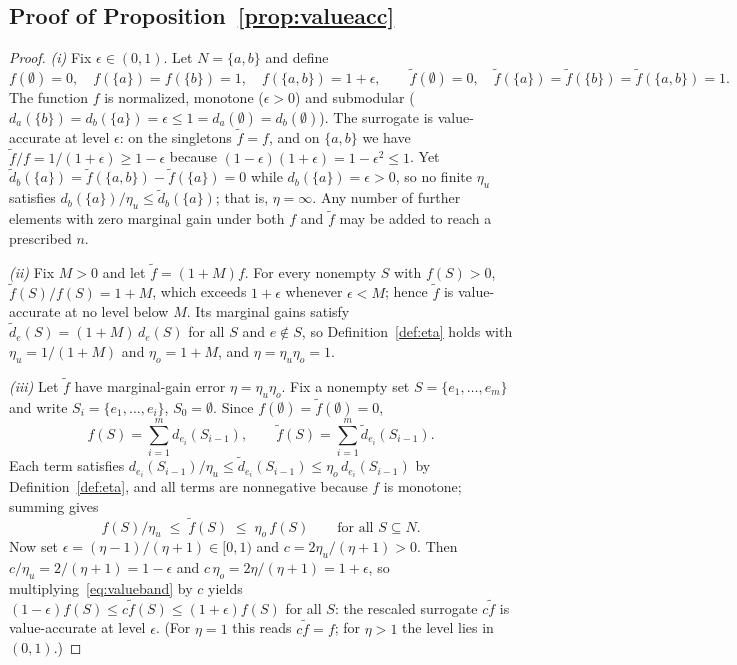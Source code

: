 \subsection{Proof of Proposition~\ref{prop:valueacc}}

\begin{proof}
\emph{(i)} Fix $\epsilon\in(0,1)$. Let $N=\{a,b\}$ and define
\[
f(\emptyset)=0,\quad f(\{a\})=f(\{b\})=1,\quad f(\{a,b\})=1+\epsilon,
\qquad
\tilde f(\emptyset)=0,\quad \tilde f(\{a\})=\tilde f(\{b\})=\tilde f(\{a,b\})=1 .
\]
The function $f$ is normalized, monotone ($\epsilon>0$) and submodular ($d_a(\{b\})=d_b(\{a\})=\epsilon\le 1=d_a(\emptyset)=d_b(\emptyset)$). The surrogate is value-accurate at level $\epsilon$: on the singletons $\tilde f=f$, and on $\{a,b\}$ we have $\tilde f/f=1/(1+\epsilon)\ge 1-\epsilon$ because $(1-\epsilon)(1+\epsilon)=1-\epsilon^2\le1$. Yet $\tilde d_b(\{a\})=\tilde f(\{a,b\})-\tilde f(\{a\})=0$ while $d_b(\{a\})=\epsilon>0$, so no finite $\eta_u$ satisfies $d_b(\{a\})/\eta_u\le\tilde d_b(\{a\})$; that is, $\eta=\infty$. Any number of further elements with zero marginal gain under both $f$ and $\tilde f$ may be added to reach a prescribed $n$.

\emph{(ii)} Fix $M>0$ and let $\tilde f=(1+M)f$. For every nonempty $S$ with $f(S)>0$, $\tilde f(S)/f(S)=1+M$, which exceeds $1+\epsilon$ whenever $\epsilon<M$; hence $\tilde f$ is value-accurate at no level below $M$. Its marginal gains satisfy $\tilde d_e(S)=(1+M)\,d_e(S)$ for all $S$ and $e\notin S$, so Definition~\ref{def:eta} holds with $\eta_u=1/(1+M)$ and $\eta_o=1+M$, and $\eta=\eta_u\eta_o=1$.

\emph{(iii)} Let $\tilde f$ have marginal-gain error $\eta=\eta_u\eta_o$. Fix a nonempty set $S=\{e_1,\dots,e_m\}$ and write $S_i=\{e_1,\dots,e_i\}$, $S_0=\emptyset$. Since $f(\emptyset)=\tilde f(\emptyset)=0$,
\[
f(S)=\sum_{i=1}^{m} d_{e_i}(S_{i-1}),
\qquad
\tilde f(S)=\sum_{i=1}^{m} \tilde d_{e_i}(S_{i-1}) .
\]
Each term satisfies $d_{e_i}(S_{i-1})/\eta_u\le\tilde d_{e_i}(S_{i-1})\le\eta_o\,d_{e_i}(S_{i-1})$ by Definition~\ref{def:eta}, and all terms are nonnegative because $f$ is monotone; summing gives
\begin{equation}\label{eq:valueband}
f(S)/\eta_u\;\le\;\tilde f(S)\;\le\;\eta_o\,f(S)\qquad\text{for all }S\subseteq N .
\end{equation}
Now set $\epsilon=(\eta-1)/(\eta+1)\in[0,1)$ and $c=2\eta_u/(\eta+1)>0$. Then $c/\eta_u=2/(\eta+1)=1-\epsilon$ and $c\,\eta_o=2\eta/(\eta+1)=1+\epsilon$, so multiplying~\eqref{eq:valueband} by $c$ yields $(1-\epsilon)f(S)\le c\tilde f(S)\le(1+\epsilon)f(S)$ for all $S$: the rescaled surrogate $c\tilde f$ is value-accurate at level $\epsilon$. (For $\eta=1$ this reads $c\tilde f=f$; for $\eta>1$ the level lies in $(0,1)$.)
\end{proof}

